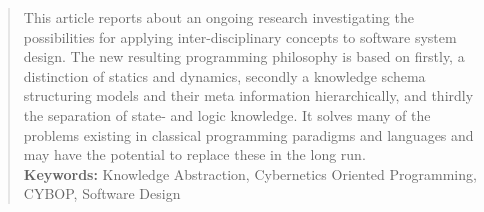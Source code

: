 %
%
%
%
%
%
%

\begin{abstract}
This article reports about an ongoing research investigating the possibilities
for applying inter-disciplinary concepts to software system design. The new
resulting programming philosophy is based on firstly, a distinction of statics
and dynamics, secondly a knowledge schema structuring models and their meta
information hierarchically, and thirdly the separation of state- and logic
knowledge. It solves many of the problems existing in classical programming
paradigms and languages and may have the potential to replace these in the long
run.\\
\textbf{Keywords:} Knowledge Abstraction, Cybernetics Oriented Programming,
CYBOP, Software Design
\end{abstract}
